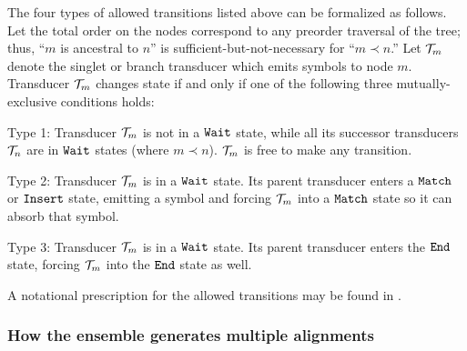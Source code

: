 \documentclass[10pt]{article}
\begin{document}
The four types of allowed transitions listed above can be formalized
as follows.
Let the total order on the nodes correspond to any preorder traversal of
the tree; thus, ``$m$ is ancestral to $n$'' is sufficient-but-not-necessary for ``$m \prec n$.''
Let ${\cal T}_m$ denote the singlet or branch transducer which emits symbols to node $m$.
Transducer ${\cal T}_m$ changes state if and only if one of the
following three mutually-exclusive conditions holds:
\begin{description}
\item{Type 1:} Transducer ${\cal T}_m$ is not in a $\mathtt{Wait}$ state,
  while all its successor transducers ${\cal T}_n$ are in $\mathtt{Wait}$
  states (where $m \prec n$).  ${\cal T}_m$ is free to make any transition.
\item{Type 2:} Transducer ${\cal T}_m$ is in a $\mathtt{Wait}$ state. Its parent transducer enters a $\mathtt{Match}$ or $\mathtt{Insert}$ state, emitting a symbol and forcing ${\cal T}_m$ into a $\mathtt{Match}$ state so it can absorb that symbol.
\item{Type 3:} Transducer ${\cal T}_m$ is in a $\mathtt{Wait}$ state. Its parent transducer enters the $\mathtt{End}$ state, forcing ${\cal T}_m$ into the $\mathtt{End}$ state as well.
\end{description}

A notational prescription for the allowed transitions may be found in .

\subsubsection*{How the ensemble generates multiple alignments}
\end{document}
